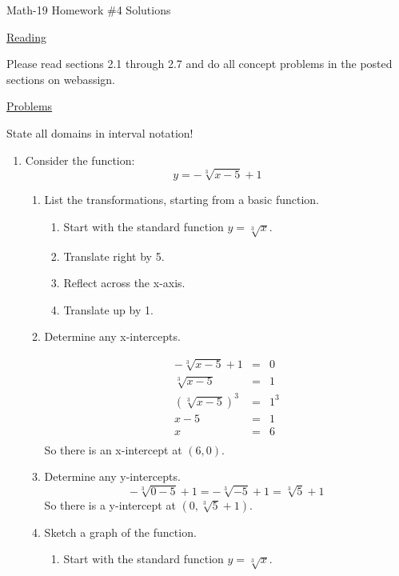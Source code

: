 \documentclass[letterpaper,12pt,fleqn]{article}
\begin{document}
\begin{center}
\Large Math-19 Homework \#4 Solutions
\end{center}

\vspace{0.5in}

\underline{Reading}

Please read sections 2.1 through 2.7 and do all concept problems in the posted
sections on web\-assign.

\underline{Problems}

State all domains in interval notation!

\begin{enumerate}
\item Consider the function:
\[y=-\sqrt[3]{x-5}+1\]
\begin{enumerate}
\item List the transformations, starting from a basic function.

\bigskip

\begin{enumerate}
\item Start with the standard function $y=\sqrt[3]{x}$.
\item Translate right by 5.
\item Reflect across the x-axis.
\item Translate up by 1.
\end{enumerate}

\bigskip

\item Determine any x-intercepts.

\begin{eqnarray*}
-\sqrt[3]{x-5}+1 &=& 0 \\
\sqrt[3]{x-5} &=& 1 \\
(\sqrt[3]{x-5})^3 &=& 1^3 \\
x-5 &=& 1 \\
x &=& 6 \\
\end{eqnarray*}
So there is an x-intercept at $(6,0)$.

\bigskip

\item Determine any y-intercepts.
\[-\sqrt[3]{0-5}+1=-\sqrt[3]{-5}+1=\sqrt[3]{5}+1\]
So there is a y-intercept at $(0,\sqrt[3]{5}+1)$.

\bigskip

\item Sketch a graph of the function.

\begin{enumerate}
\item Start with the standard function $y=\sqrt[3]{x}$.


\end{enumerate}
\end{enumerate}
\end{enumerate}
\end{document}

